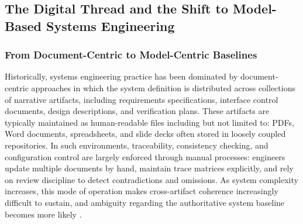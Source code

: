 \subsection{The Digital Thread and the Shift to Model-Based Systems Engineering}
\label{subsec:ch2_digital_thread_and_mbse}



\subsubsection{From Document-Centric to Model-Centric Baselines}
\label{subsubsec:ch2_doc_to_model}

Historically, systems engineering practice has been dominated by document-centric approaches in which the system definition is distributed across collections of narrative artifacts, including requirements specifications, interface control documents, design descriptions, and verification plans. These artifacts are typically maintained as human-readable files including but not limited to: PDFs, Word documents, spreadsheets, and slide decks often stored in loosely coupled repositories. In such environments, traceability, consistency checking, and configuration control are largely enforced through manual processes: engineers update multiple documents by hand, maintain trace matrices explicitly, and rely on review discipline to detect contradictions and omissions. As system complexity increases, this mode of operation makes cross-artifact coherence increasingly difficult to sustain, and ambiguity regarding the authoritative system baseline becomes more likely \cite{incose_GuideSystemsEngineering_2025}.

